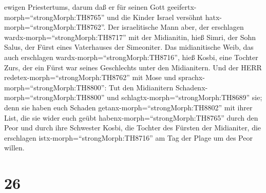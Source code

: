 ewigen Priestertums, darum daß er für seinen Gott
geeifertx-morph=``strongMorph:TH8765'' und die Kinder Israel versöhnt
hatx-morph=``strongMorph:TH8762''.  Der israelitische Mann
aber, der erschlagen wardx-morph=``strongMorph:TH8717'' mit der
Midianitin, hieß Simri, der Sohn Salus, der Fürst eines Vaterhauses der
Simeoniter.  Das midianitische Weib, das auch erschlagen
wardx-morph=``strongMorph:TH8716'', hieß Kosbi, eine Tochter Zurs, der
ein Fürst war seines Geschlechts unter den Midianitern. 
Und der HERR redetex-morph=``strongMorph:TH8762'' mit Mose und
sprachx-morph=``strongMorph:TH8800'':  Tut den Midianitern
Schadenx-morph=``strongMorph:TH8800'' und
schlagtx-morph=``strongMorph:TH8689'' sie;  denn sie haben
euch Schaden getanx-morph=``strongMorph:TH8802'' mit ihrer List, die sie
wider euch geübt habenx-morph=``strongMorph:TH8765'' durch den Peor und
durch ihre Schwester Kosbi, die Tochter des Fürsten der Midianiter, die
erschlagen istx-morph=``strongMorph:TH8716'' am Tag der Plage um des
Peor willen.

\hypertarget{section-25}{%
\section{26}\label{section-25}}

